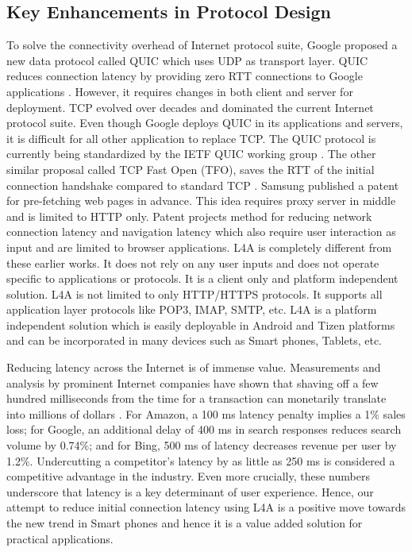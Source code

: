 \begin{multicols}{2}
\subsection{Key Enhancements in Protocol Design}

To solve the connectivity overhead of Internet protocol suite, Google proposed a new data protocol called QUIC which uses UDP as transport layer. QUIC reduces connection latency by providing zero RTT connections to Google applications \cite{art1-key18}. However, it requires changes in both client and server for deployment. TCP evolved over decades and dominated the current Internet protocol suite. Even though Google deploys QUIC in its applications and  servers, it is difficult for all other application to replace TCP. The QUIC protocol is currently being standardized by the IETF QUIC working group \cite{art1-key19}. The other similar proposal called TCP Fast Open (TFO), saves the RTT of the initial connection handshake compared to standard TCP \cite{art1-key20}. Samsung published a patent \cite{art1-key21} for pre-fetching web pages in advance. This idea requires proxy server in middle and is limited to HTTP only. Patent \cite{art1-key22} projects method for reducing network connection latency and navigation latency which also require user interaction as input and are limited to browser applications. L4A is completely different from these earlier works. It does not rely on any user inputs and does not operate specific to applications or protocols. It is a client only and platform independent solution.  L4A is not limited to only HTTP/HTTPS protocols. It supports all application layer protocols like POP3, IMAP, SMTP, etc. L4A is a platform independent solution which is easily deployable in Android and Tizen platforms and can be incorporated in many devices such as Smart phones, Tablets, etc.

Reducing latency across the Internet is of immense value. Measurements and analysis by prominent Internet companies have shown that shaving off a few hundred milliseconds from the time for a transaction can monetarily translate into millions of dollars \cite{art1-key23}. For Amazon, a 100 ms latency penalty implies a 1$\%$ sales loss; for Google, an additional delay of 400 ms in search responses reduces search volume by 0.74$\%$; and for Bing, 500 ms of latency decreases revenue per user by 1.2$\%$. Undercutting a competitor’s latency by as little as 250 ms is considered a competitive advantage in the industry. Even more crucially, these numbers underscore that latency is a key determinant of user experience. Hence, our attempt to reduce initial connection latency using L4A is a positive move towards the new trend in Smart phones and hence it is a value added solution for practical applications. 


\end{multicols}
